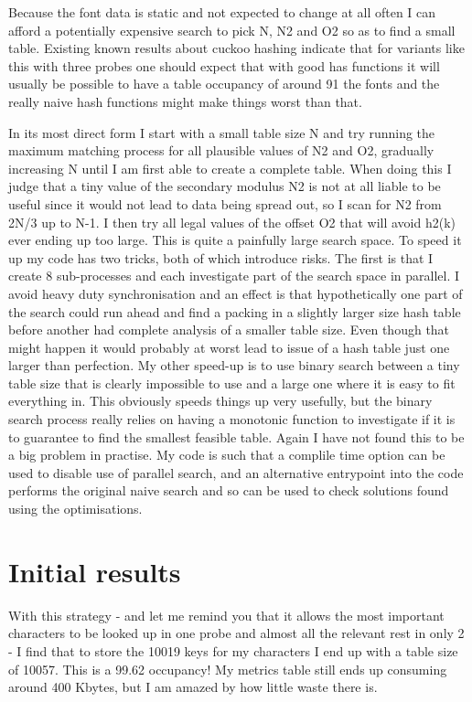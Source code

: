 \documentclass [a4paper,11pt]{article}
\begin{document}
Because the font data is static and not expected to change at all often I 
can afford a potentially expensive search to pick N, N2 and O2 so as to 
find a small table. Existing known results about cuckoo hashing indicate 
that for variants like this with three probes one should expect that with 
good has functions it will usually be possible to have a table occupancy 
of around 91%
the fonts and the really naive hash functions might make things worst than 
that.

In its most direct form I start with a small table size N and try running 
the maximum matching process for all plausible values of N2 and O2, 
gradually increasing N until I am first able to create a complete table.
When doing this I judge that a tiny value of the secondary modulus N2 is 
not at all liable to be useful since it would not lead to data being 
spread out, so I scan for N2 from 2N/3 up to N-1. I then try all legal 
values of the offset O2 that will avoid h2(k) ever ending up too large. 
This is quite a painfully large search space. To speed it up my code has 
two tricks, both of which introduce risks. The first is that I create 8 
sub-processes and each investigate part of the search space in parallel. I 
avoid heavy duty synchronisation and an effect is that hypothetically one 
part of the search could run ahead and find a packing in a slightly larger 
size hash table before another had complete analysis of a smaller table 
size. Even though that might happen it would probably at worst lead to 
issue of a hash table just one larger than perfection. My other speed-up 
is to use binary search between a tiny table size that is clearly 
impossible to use and a large one where it is easy to fit everything in. 
This obviously speeds things up very usefully, but the binary search 
process really relies on having a monotonic function to investigate if it 
is to guarantee to find the smallest feasible table. Again I have not 
found this to be a big problem in practise. My code is such that a 
complile time option can be used to disable use of parallel search, and an 
alternative entrypoint into the code performs the original naive search 
and so can be used to check solutions found using the optimisations.

\section{Initial results}

With this strategy - and let me remind you that it allows the most 
important characters to be looked up in one probe and almost all the 
relevant rest in only 2 - I find that to store the 10019 keys for my 
characters I end up with a table size of 10057. This is a 99.62%
occupancy! My metrics table still ends up consuming around 400 Kbytes, but 
I am amazed by how little waste there is.
\end{document}
